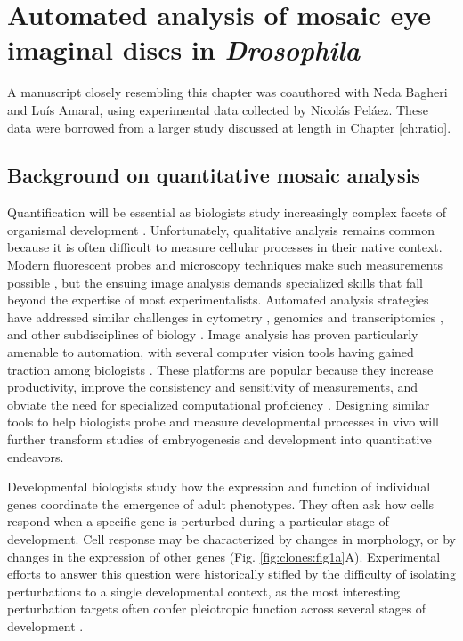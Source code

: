 
\graphicspath{ {./figures/clones/} }


\chapter{Automated analysis of mosaic eye imaginal discs in \textit{Drosophila}}
\label{ch:clones}

A manuscript closely resembling this chapter was coauthored with Neda Bagheri and Lu\'{i}s Amaral, using experimental data collected by Nicol\'{a}s Pel\'{a}ez. These data were borrowed from a larger study discussed at length in Chapter \ref{ch:ratio}.


\section{Background on quantitative mosaic analysis}

Quantification will be essential as biologists study increasingly complex facets of organismal development \cite{Oates2009}. Unfortunately, qualitative analysis remains common because it is often difficult to measure cellular processes in their native context. Modern fluorescent probes and microscopy techniques make such measurements possible \cite{Muzzey2009a,Stelzer2014,Truong2011}, but the ensuing image analysis demands specialized skills that fall beyond the expertise of most experimentalists. Automated analysis strategies have addressed similar challenges in cytometry \cite{Aghaeepour2013,Chen2015,Pyne2009}, genomics and transcriptomics \cite{Bernstein2008,Hellemans2007,Langmead2012,Trapnell2009}, and other subdisciplines of biology \cite{Costes2004,Kelley2015}. Image analysis has proven particularly amenable to automation, with several computer vision tools having gained traction among biologists \cite{Carpenter2006,Paintdakhi2016,Schindelin2012,Sommer2011}. These platforms are popular because they increase productivity, improve the consistency and sensitivity of measurements, and obviate the need for specialized computational proficiency \cite{Jug2014,Sbalzarini2016,Schindelin2015}. Designing similar tools to help biologists probe and measure developmental processes in vivo will further transform studies of embryogenesis and development into quantitative endeavors.

Developmental biologists study how the expression and function of individual genes coordinate the emergence of adult phenotypes. They often ask how cells respond when a specific gene is perturbed during a particular stage of development. Cell response may be characterized by changes in morphology, or by changes in the expression of other genes (Fig. \ref{fig:clones:fig1a}A). Experimental efforts to answer this question were historically stifled by the difficulty of isolating perturbations to a single developmental context, as the most interesting perturbation targets often confer pleiotropic function across several stages of development \cite{IanSimpson2002,Parody1993,Shilo1991}. 

